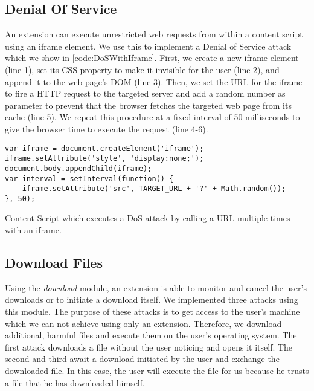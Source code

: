 \subsection{Denial Of Service}

	An extension can execute unrestricted web requests from within a content script using an iframe element. We use this to implement a Denial of Service attack which we show in \autoref{code:DoSWithIframe}. First, we create a new iframe element (line 1), set its CSS property to make it invisible for the user (line 2), and append it to the web page's DOM (line 3). Then, we set the URL for the iframe to fire a HTTP request to the targeted server and add a random number as parameter to prevent that the browser fetches the targeted web page from its cache (line 5). We repeat this procedure at a fixed interval of 50 milliseconds to give the browser time to execute the request (line 4-6).

	\begin{code}
		\begin{lstlisting}
var iframe = document.createElement('iframe');
iframe.setAttribute('style', 'display:none;');
document.body.appendChild(iframe);
var interval = setInterval(function() {	
	iframe.setAttribute('src', TARGET_URL + '?' + Math.random());
}, 50);
\end{lstlisting}
		\caption{Content Script which executes a DoS attack by calling a URL multiple times with an iframe.}
		\label{code:DoSWithIframe}
	\end{code}





\subsection{Download Files}

	Using the \textit{download} module, an extension is able to monitor and cancel the user's downloads or to initiate a download itself. We implemented three attacks using this module. The purpose of these attacks is to get access to the user's machine which we can not achieve using only an extension. Therefore, we download additional, harmful files and execute them on the user's operating system. The first attack downloads a file without the user noticing and opens it itself. The second and third await a download initiated by the user and exchange the downloaded file. In this case, the user will execute the file for us because he trusts a file that he has downloaded himself.
	
